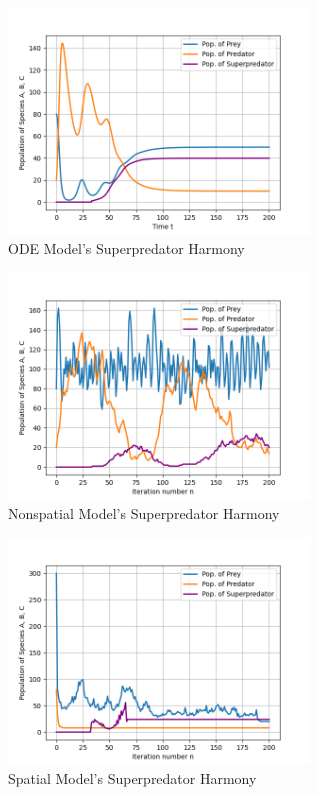 \documentclass[journal]{IEEEtran}
\begin{document}
\begin{figure}[h]
    \vspace{-5mm}
    \centering
    \includegraphics[width=8cm]{images/superpredator_harmony_ode.png}
    \vspace{-8mm}
    \caption{ODE Model's Superpredator Harmony}
    \label{fig:superpredator_harmony_ode}
\end{figure}
\begin{figure}[h]
    \vspace{-5mm}
    \centering
    \includegraphics[width=8cm]{images/superpredator_harmony_nonspatial.png}
    \vspace{-8mm}
    \caption{Nonspatial Model's Superpredator Harmony}
    \label{fig:superpredator_harmony_nonspatial}
\end{figure}
\begin{figure}[h]
    \vspace{-5mm}
    \centering
    \includegraphics[width=8cm]{images/superpredator_harmony_spatial.png}
    \vspace{-8mm}
    \caption{Spatial Model's Superpredator Harmony}
    \label{fig:superpredator_harmony_spatial}
\end{figure}
\end{document}
